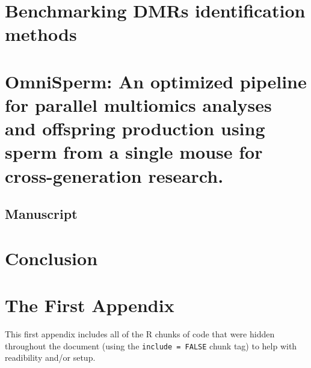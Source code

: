\documentclass[12pt,twoside]{reedthesis}
\begin{document}
\hypertarget{benchmarking-dmrs-identification-methods}{%
\chapter{Benchmarking DMRs identification methods}\label{benchmarking-dmrs-identification-methods}}

\hypertarget{omnisperm-an-optimized-pipeline-for-parallel-multiomics-analyses-and-offspring-production-using-sperm-from-a-single-mouse-for-cross-generation-research.}{%
\chapter{OmniSperm: An optimized pipeline for parallel multiomics analyses and offspring production using sperm from a single mouse for cross-generation research.}\label{omnisperm-an-optimized-pipeline-for-parallel-multiomics-analyses-and-offspring-production-using-sperm-from-a-single-mouse-for-cross-generation-research.}}

\hypertarget{manuscript}{%
\section{Manuscript}\label{manuscript}}

\hypertarget{conclusion}{%
\chapter*{Conclusion}\label{conclusion}}

\appendix

\hypertarget{the-first-appendix}{%
\chapter{The First Appendix}\label{the-first-appendix}}

This first appendix includes all of the R chunks of code that were hidden throughout the document (using the \texttt{include\ =\ FALSE} chunk tag) to help with readibility and/or setup.
\end{document}
